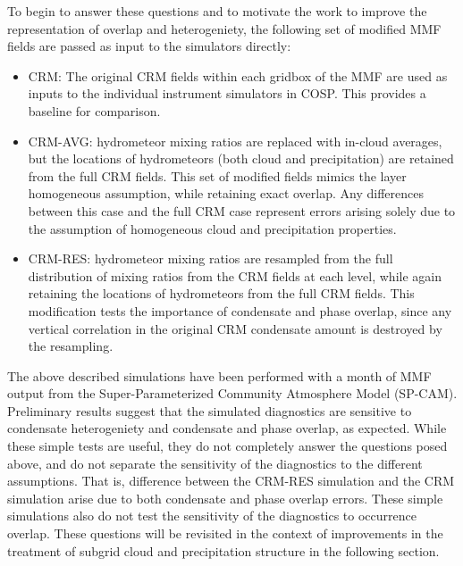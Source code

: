 \documentclass{article}
\begin{document}
To begin to answer these questions and to motivate the work to improve the representation of overlap and heterogeniety, the following set of modified MMF fields are passed as input to the simulators directly:
\begin{itemize}
\item CRM: The original CRM fields within each gridbox of the MMF are used as inputs to the individual instrument simulators in COSP. This provides a baseline for comparison.
\item CRM-AVG: hydrometeor mixing ratios are replaced with in-cloud averages, but the locations of hydrometeors (both cloud and precipitation) are retained from the full CRM fields. This set of modified fields mimics the layer homogeneous assumption, while retaining exact overlap. Any differences between this case and the full CRM case represent errors arising solely due to the assumption of homogeneous cloud and precipitation properties.
\item CRM-RES: hydrometeor mixing ratios are resampled from the full distribution of mixing ratios from the CRM fields at each level, while again retaining the locations of hydrometeors from the full CRM fields. This modification tests the importance of condensate and phase overlap, since any vertical correlation in the original CRM condensate amount is destroyed by the resampling.
\end{itemize}

The above described simulations have been performed with a month of MMF output from the Super-Parameterized Community Atmosphere Model (SP-CAM). Preliminary results suggest that the simulated diagnostics are sensitive to condensate heterogeniety and condensate and phase overlap, as expected. While these simple tests are useful, they do not completely answer the questions posed above, and do not separate the sensitivity of the diagnostics to the different assumptions. That is, difference between the CRM-RES simulation and the CRM simulation arise due to both condensate and phase overlap errors. These simple simulations also do not test the sensitivity of the diagnostics to occurrence overlap. These questions will be revisited in the context of improvements in the treatment of subgrid cloud and precipitation structure in the following section.



\end{document}
